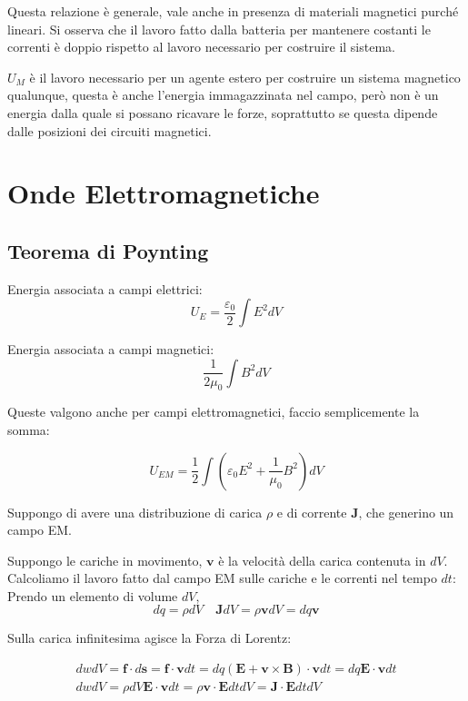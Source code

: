 \documentclass[a4paper]{scrarticle}
\begin{document}
Questa relazione è generale, vale anche in presenza di materiali magnetici purché lineari. Si osserva che il lavoro fatto dalla batteria per mantenere costanti le correnti è doppio rispetto al lavoro necessario per costruire il sistema.

$U_M$ è il lavoro necessario per un agente estero per costruire un sistema magnetico qualunque, questa è anche l'energia immagazzinata nel campo, però non è un energia dalla quale si possano ricavare le forze, soprattutto se questa dipende dalle posizioni dei circuiti magnetici.

\section{Onde Elettromagnetiche}

\subsection{Teorema di Poynting}

Energia associata a campi elettrici:
\begin{equation*}
    U_E = \frac{\varepsilon_0}{2} \int E^2 dV 
\end{equation*}

Energia associata a campi magnetici:
\begin{equation*}
    \frac{1}{2 \mu_0} \int B^2 dV
\end{equation*}

Queste valgono anche per campi elettromagnetici, faccio semplicemente la somma:

\begin{equation}
    U_{EM} = \frac{1}{2} \int (\varepsilon_0 E^2 + \frac{1}{\mu_0} B^2)dV
\end{equation}

Suppongo di avere una distribuzione di carica $\rho$ e di corrente $\bm J$, che generino un campo EM.

Suppongo le cariche in movimento, $\bm v$ è la velocità della carica contenuta in $dV$.
Calcoliamo il lavoro fatto dal campo EM sulle cariche e le correnti nel tempo $dt$:
Prendo un elemento di volume $dV$,
\begin{equation*}
    dq = \rho dV \quad \bm J dV = \rho \bm v dV = dq \bm v
\end{equation*}

Sulla carica infinitesima agisce la Forza di Lorentz:

\begin{gather*}
    dw dV = \bm f \cdot d\bm s = \bm f \cdot \bm v dt = dq (\bm E + \bm v\times \bm B )\cdot \bm v dt = dq \bm E \cdot \bm v dt\\
    dw dV = \rho dV \bm E \cdot \bm v dt = \rho \bm v \cdot \bm E dtdV = \bm J \cdot \bm E dtdV
\end{gather*}
\end{document}
